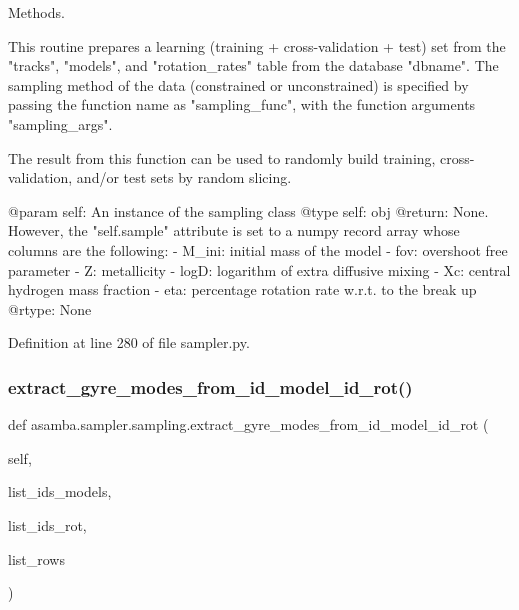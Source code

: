 Methods. 

\begin{DoxyVerb}This routine prepares a learning (training + cross-validation + test) set from the "tracks", "models",
and "rotation_rates" table from the database "dbname". The sampling method of the data (constrained or
unconstrained) is specified by passing the function name as "sampling_func", with the function arguments
"sampling_args".

The result from this function can be used to randomly build training, cross-validation, and/or test
sets by random slicing.

@param self: An instance of the sampling class
@type self: obj
@return: None. However, the "self.sample" attribute is set to a numpy record array whose columns are
  the following:
  - M_ini: initial mass of the model
  - fov: overshoot free parameter
  - Z: metallicity
  - logD: logarithm of extra diffusive mixing
  - Xc: central hydrogen mass fraction
  - eta: percentage rotation rate w.r.t. to the break up
@rtype: None
\end{DoxyVerb}
 

Definition at line 280 of file sampler.\+py.

\mbox{\label{classasamba_1_1sampler_1_1sampling_abdedb54b26dfc7605977d2103ce050b0}} 
\subsubsection{\texorpdfstring{extract\+\_\+gyre\+\_\+modes\+\_\+from\+\_\+id\+\_\+model\+\_\+id\+\_\+rot()}{extract\_gyre\_modes\_from\_id\_model\_id\_rot()}}
{\footnotesize\ttfamily def asamba.\+sampler.\+sampling.\+extract\+\_\+gyre\+\_\+modes\+\_\+from\+\_\+id\+\_\+model\+\_\+id\+\_\+rot (\begin{DoxyParamCaption}\item[{}]{self,  }\item[{}]{list\+\_\+ids\+\_\+models,  }\item[{}]{list\+\_\+ids\+\_\+rot,  }\item[{}]{list\+\_\+rows }\end{DoxyParamCaption})}


